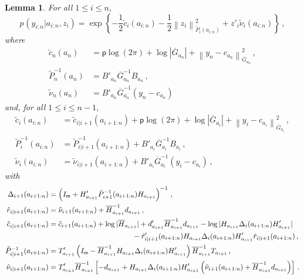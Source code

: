 \documentclass[nolayout]{article}
\theoremstyle{plain}
\newtheorem{lemma}[lemma]{Lemma}
\theoremstyle{definition}
\newcommand{\1}{\mathbbm{1}}
\def\dimy{\mathsf{p}}
\def\dimz{\mathsf{m}}
\def\barG{\overline{G}}
\def\barH{\overline{H}}
\def\eqsp{\,}
\newcommand{\normMat}[2]{\left\|#2\right\|_{#1}}
\begin{document}
\begin{lemma}
\label{lem:py}
For all $1\le i \le n$,
\begin{equation}
\label{eq:py}
p_{}(y_{i:n}|a_{i:n},z_i) =  \exp\left\{-\frac{1}{2}\tilde{c}_{i}(a_{i:n}) - \frac{1}{2}\normMat{\tilde{P}_{i}(a_{i:n})}{z_i}^2 + z'_i\tilde{\nu}_{i}(a_{i:n})\right\}\eqsp,
\end{equation}
where
\begin{align}
\tilde{c}_{n}(a_{n}) &= \dimy\log(2\pi) + \log \left|\barG_{a_n}\right| + \normMat{\barG_{a_n}}{y_n-c_{a_n}}^2\eqsp,\label{eq:cn}\\
\tilde{P}_{n}^{-1}(a_{n}) &=B'_{a_n}\barG_{a_n}^{-1}B_{a_n}\eqsp,\label{eq:Pn}\\
\tilde{\nu}_{n}(a_{n})&=B'_{a_n}\barG_{a_n}^{-1}(y_n-c_{a_n})\label{eq:nun}
\end{align}
and, for all $1\le i\le n-1$,
\begin{align}
\tilde{c}_{i}(a_{i:n}) &= \tilde{c}_{i|i+1}(a_{i+1:n}) + \dimy\log(2\pi)  + \log|\barG_{a_i}| + \normMat{\barG_{a_i}}{y_i-c_{a_i}}^2\eqsp,\label{eq:ck}\\
\tilde{P}_{i}^{-1}(a_{i:n}) &= \tilde{P}_{i|i+1}^{-1}(a_{i+1:n}) + B'_{a_i}\barG_{a_i}^{-1}B_{a_i}\eqsp,\label{eq:Pk}\\
\tilde{\nu}_{i}(a_{i:n})&=\tilde{\nu}_{i|i+1}(a_{i+1:n}) + B'_{a_i}\barG_{a_i}^{-1}(y_{i}-c_{a_{i}})\eqsp,\label{eq:nuk}
\end{align}
with
\begin{align*}
\Delta_{i+1}(a_{i+1:n}) &= \left(I_{\dimz} + H'_{a_{i+1}}\tilde{P}_{i+1}^{-1}(a_{i+1:n})H_{a_{i+1}}\right)^{-1}\eqsp,\\
\tilde{r}_{i|i+1}(a_{i+1:n})&= \tilde{\nu}_{i+1}(a_{i+1:n}) + \barH_{a_{i+1}}^{-1}d_{a_{i+1}}\eqsp,\\
\tilde{c}_{i|i+1}(a_{i+1:n}) &= \tilde{c}_{i+1}(a_{i+1:n}) + \log|\barH_{a_{i+1}}| + d'_{a_{i+1}}\barH_{a_{i+1}}^{-1}d_{a_{i+1}}-\log|H_{a_{i+1}}\Delta_{i}(a_{i+1:n})H'_{a_{i+1}}|\\
&\hspace{4.0cm} - \tilde{r}'_{i|i+1}(a_{i+1:n})H_{a_{i+1}}\Delta_{i}(a_{i+1:n})H'_{a_{i+1}}\tilde{r}_{i|i+1}(a_{i+1:n})\eqsp,\\
\tilde{P}_{i|i+1}^{-1}(a_{i+1:n}) &=T'_{a_{i+1}}\left(I_{\dimz}-\barH_{a_{i+1}}^{-1}H_{a_{i+1}}\Delta_{i}(a_{i+1:n})H'_{a_{i+1}}\right)\barH_{a_{i+1}}^{-1}T_{a_{i+1}}\eqsp,\\
\tilde{\nu}_{i|i+1}(a_{i+1:n})&=T'_{a_{i+1}}\barH_{a_{i+1}}^{-1}\left[-d_{a_{i+1}}+H_{a_{i+1}}\Delta_{i}(a_{i+1:n})H'_{a_{i+1}}\left(\tilde{\nu}_{i+1}(a_{i+1:n})+\barH_{a_{i+1}}^{-1}d_{a_{i+1}}\right)\right]\eqsp.
\end{align*}
\end{lemma}
\end{document}
